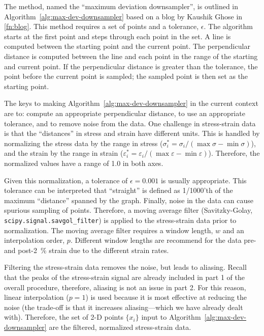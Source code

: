 \documentclass[a4paper,11pt]{article}
\begin{document}
The method, named the ``maximum deviation downsampler'', is outlined in Algorithm~\ref{alg:max-dev-downsampler} based on a blog by Kaushik Ghose in \cref{fn:blog}.
This method requires a set of points and a tolerance, $\epsilon$.
The algorithm starts at the first point and steps through each point in the set.
A line is computed between the starting point and the current point.
The perpendicular distance is computed between the line and each point in the range of the starting and current point.
If the perpendicular distance is greater than the tolerance, the point before the current point is sampled; the sampled point is then set as the starting point.

The keys to making Algorithm~\ref{alg:max-dev-downsampler} in the current context are to: compute an appropriate perpendicular distance, to use an appropriate tolerance, and to remove noise from the data.
One challenge in stress-strain data is that the ``distances'' in stress and strain have different units.
This is handled by normalizing the stress data by the range in stress ($\sigma_i^* = \sigma_i / (\max \sigma - \min \sigma)$), and the strain by the range in strain ($\varepsilon_i^* = \varepsilon_i / (\max \varepsilon - \min \varepsilon)$).
Therefore, the normalized values have a range of 1.0 in both axes.

Given this normalization, a tolerance of $\epsilon = 0.001$ is usually appropriate.
This tolerance can be interpreted that ``straight'' is defined as 1/1000'th of the maximum ``distance'' spanned by the graph.
Finally, noise in the data can cause spurious sampling of points.
Therefore, a moving average filter (Savitzky-Golay, \texttt{scipy.signal.savgol\_filter}) is applied to the stress-strain data prior to normalization.
The moving average filter requires a window length, $w$ and an interpolation order, $p$.
Different window lengths are recommend for the data pre- and post-2~\% strain due to the different strain rates.

Filtering the stress-strain data removes the noise, but leads to aliasing.
Recall that the peaks of the stress-strain signal are already included in part 1 of the overall procedure, therefore, aliasing is not an issue in part 2.
For this reason, linear interpolation ($p = 1$) is used because it is most effective at reducing the noise (the trade-off is that it increases aliasing---which we have already dealt with).
Therefore, the set of 2-D points $\{x_i\}$ input to Algorithm~\ref{alg:max-dev-downsampler} are the filtered, normalized stress-strain data.
\end{document}

